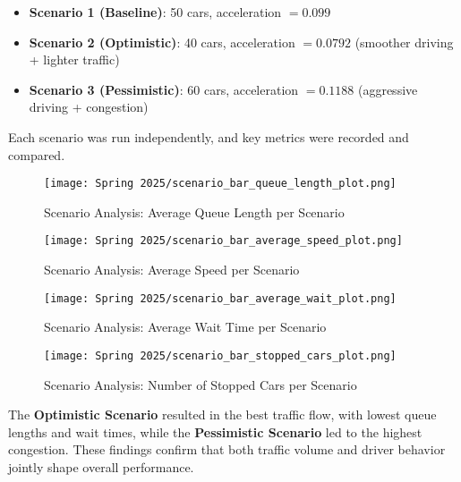 \documentclass[12pt]{article}
\begin{document}
\begin{itemize}
    \item \textbf{Scenario 1 (Baseline)}: 50 cars, acceleration $= 0.099$
    \item \textbf{Scenario 2 (Optimistic)}: 40 cars, acceleration $= 0.0792$ (smoother driving + lighter traffic)
    \item \textbf{Scenario 3 (Pessimistic)}: 60 cars, acceleration $= 0.1188$ (aggressive driving + congestion)
\end{itemize}

Each scenario was run independently, and key metrics were recorded and compared.

\vspace{1em}
\begin{figure}[H]
    \centering
    \texttt{[image: Spring 2025/scenario\_bar\_queue\_length\_plot.png]}
    \caption{Scenario Analysis: Average Queue Length per Scenario}
    \label{fig:scenario-queue}
\end{figure}

\vspace{1em}
\begin{figure}[H]
    \centering
    \texttt{[image: Spring 2025/scenario\_bar\_average\_speed\_plot.png]}
    \caption{Scenario Analysis: Average Speed per Scenario}
    \label{fig:scenario-speed}
\end{figure}

\vspace{1em}
\begin{figure}[H]
    \centering
    \texttt{[image: Spring 2025/scenario\_bar\_average\_wait\_plot.png]}
    \caption{Scenario Analysis: Average Wait Time per Scenario}
    \label{fig:scenario-wait}
\end{figure}

\vspace{1em}
\begin{figure}[H]
    \centering
    \texttt{[image: Spring 2025/scenario\_bar\_stopped\_cars\_plot.png]}
    \caption{Scenario Analysis: Number of Stopped Cars per Scenario}
    \label{fig:scenario-stopped}
\end{figure}

The \textbf{Optimistic Scenario} resulted in the best traffic flow, with lowest queue lengths and wait times, while the \textbf{Pessimistic Scenario} led to the highest congestion. These findings confirm that both traffic volume and driver behavior jointly shape overall performance.
\end{document}
